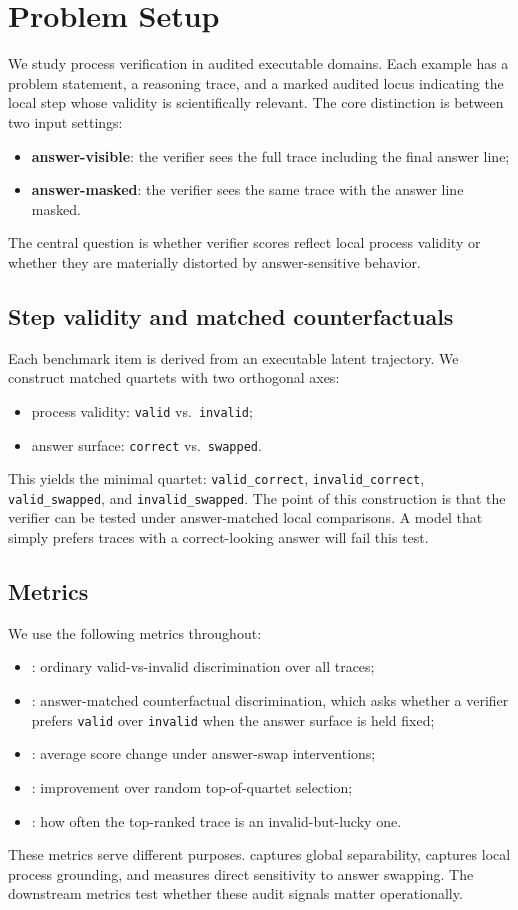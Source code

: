 \section{Problem Setup}

We study process verification in audited executable domains. Each example has a
problem statement, a reasoning trace, and a marked audited locus indicating the
local step whose validity is scientifically relevant. The core distinction is
between two input settings:
\begin{itemize}[leftmargin=1.5em]
\item \textbf{answer-visible}: the verifier sees the full trace including the
final answer line;
\item \textbf{answer-masked}: the verifier sees the same trace with the answer
line masked.
\end{itemize}
The central question is whether verifier scores reflect local process validity
or whether they are materially distorted by answer-sensitive behavior.

\subsection{Step validity and matched counterfactuals}

Each benchmark item is derived from an executable latent trajectory. We
construct matched quartets with two orthogonal axes:
\begin{itemize}[leftmargin=1.5em]
\item process validity: \texttt{valid} vs.\ \texttt{invalid};
\item answer surface: \texttt{correct} vs.\ \texttt{swapped}.
\end{itemize}
This yields the minimal quartet:
\texttt{valid\_correct}, \texttt{invalid\_correct},
\texttt{valid\_swapped}, and \texttt{invalid\_swapped}. The point of this
construction is that the verifier can be tested under answer-matched local
comparisons. A model that simply prefers traces with a correct-looking answer
will fail this test.

\subsection{Metrics}

We use the following metrics throughout:
\begin{itemize}[leftmargin=1.5em]
\item \auroc: ordinary valid-vs-invalid discrimination over all traces;
\item \amcd: answer-matched counterfactual discrimination, which asks whether a
verifier prefers \texttt{valid} over \texttt{invalid} when the answer surface
is held fixed;
\item \asstotal: average score change under answer-swap interventions;
\item \selectiongain: improvement over random top-of-quartet selection;
\item \exploitability: how often the top-ranked trace is an invalid-but-lucky
one.
\end{itemize}

These metrics serve different purposes. \auroc{} captures global separability,
\amcd{} captures local process grounding, and \asstotal{} measures direct
sensitivity to answer swapping. The downstream metrics test whether these audit
signals matter operationally.
